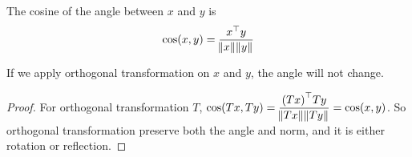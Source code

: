 \begin{theorem}
    The cosine of the angle between $x$ and $y$ is
    \begin{equation}
        \cos(x,y) = \frac{{x}^\top y}{\norm{x} \norm{y}}
    \end{equation}
    
    If we apply orthogonal transformation on $x$ and $y$, the angle will not change.
\end{theorem}
\begin{proof}
    For orthogonal transformation $T$, $\displaystyle \cos(Tx, Ty) = \frac{{(Tx)}^\top Ty}{\norm{Tx} \norm{Ty}} = \cos(x,y)$. So orthogonal transformation preserve both the angle and norm, and it is either rotation or reflection.
\end{proof}






















































